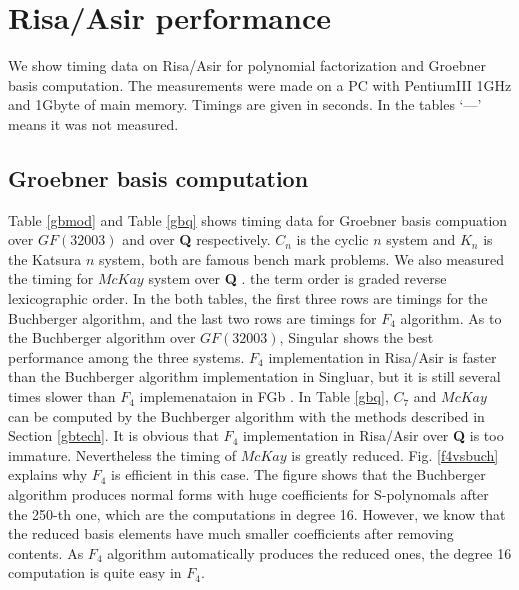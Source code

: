 \documentclass[runningheads]{cl2emult}
\begin{document}

\section{Risa/Asir performance}

We show timing data on Risa/Asir for polynomial factorization
and Groebner basis computation. The measurements were made on
a PC with PentiumIII 1GHz and 1Gbyte of main memory. Timings
are given in seconds. In the tables `---' means it was not
measured.

\subsection{Groebner basis computation}

Table \ref{gbmod} and Table \ref{gbq} shows timing data for Groebner
basis compuation over $GF(32003)$ and over {\bf Q} respectively.
$C_n$ is the cyclic $n$ system and $K_n$ is the Katsura $n$ system,
both are famous bench mark problems.  We also measured the timing for
$McKay$ system over {\bf Q} \cite{REPL}.  the term order is graded
reverse lexicographic order.  In the both tables, the first three rows
are timings for the Buchberger algorithm, and the last two rows are
timings for $F_4$ algorithm. As to the Buchberger algorithm over
$GF(32003)$, Singular\cite{SINGULAR} shows the best performance among
the three systems. $F_4$ implementation in Risa/Asir is faster than
the Buchberger algorithm implementation in Singluar, but it is still
several times slower than $F_4$ implemenataion in FGb \cite{FGB}.  In
Table \ref{gbq}, $C_7$ and $McKay$ can be computed by the Buchberger
algorithm with the methods described in Section \ref{gbtech}.  It is
obvious that $F_4$ implementation in Risa/Asir over {\bf Q} is too
immature. Nevertheless the timing of $McKay$ is greatly reduced.
Fig. \ref{f4vsbuch} explains why $F_4$ is efficient in this case.
The figure shows that 
the Buchberger algorithm produces normal forms with
huge coefficients for S-polynomals after the 250-th one,
which are the computations in degree 16.
However, we know that the reduced basis elements have
much smaller coefficients after removing contents.
As $F_4$ algorithm automatically produces the reduced ones,
the degree 16 computation is quite easy in $F_4$.
\end{document}
